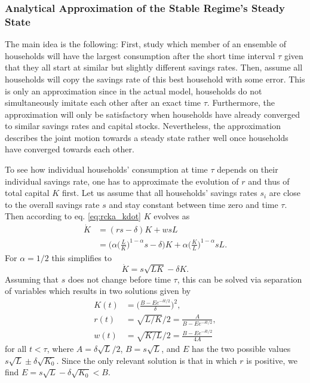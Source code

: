 \subsubsection{Analytical Approximation of the Stable Regime's Steady State}
\label{sec:rck_stable}
The main idea is the following: First, study which member of an ensemble of households  will have the largest consumption after the short time interval $\tau$ given that they all start at similar but slightly different savings rates. Then, assume all households will copy the savings rate of this best household with some error. 
This is only an approximation since in the actual model, households do not simultaneously imitate each other after an exact time $\tau$. Furthermore, the approximation will only be satisfactory when households have already converged to similar savings rates and capital stocks.
Nevertheless, the approximation describes the joint motion towards a steady state  rather well once households have converged towards each other.

To see how individual households' consumption at time $\tau$ depends on their individual savings rate, one has to approximate the evolution of $r$ and thus of total capital $K$ first. Let us assume that all households' savings rates $s_i$ are close to the overall savings rate $s$ and stay constant between time zero and time $\tau$. 
Then according to eq. \eqref{eq:rcka_kdot} $K$ evolves as 
\begin{equation}
    \begin{split}
    \dot K &= (r s - \delta) K + w s L \nonumber \\
    	   &= \Big(\alpha\Big(\frac{L}{K}\Big)^{1-\alpha} s - \delta\Big) K + \alpha \Big(\frac{K}{L}\Big)^{1-\alpha} s L.  
	\end{split}
\end{equation}
For $\alpha = 1/2$ this simplifies to 
\begin{equation}
    \label{aggKdotnew}
    \dot{K} = s\sqrt{L K} - \delta K.
\end{equation}
Assuming that $s$ does not change before time $\tau$, this can be solved via separation of variables which results in two solutions given by 
\begin{equation}
\begin{split}
    K(t) &= \Big(\frac{B - E e^{-\delta t/2}}{\delta} \Big)^2, \\
    r(t) &= \sqrt{L/K} / 2 = \frac{A}{B - E e^{-\delta t/2}}, \\
    w(t) &= \sqrt{K/L} / 2 = \frac{B - E e^{-\delta t/2}}{4 A}
\end{split}
\end{equation}
for all $t < \tau$,
where 
$A = \delta \sqrt{L} / 2$,
$B = s\sqrt{L}$,
and
$E$ has the two possible values $s\sqrt{L} \pm \delta \sqrt{K_0}$.
Since the only relevant solution is that in which $r$ is positive, we find $E = s\sqrt{L} - \delta \sqrt{K_0} < B$.

